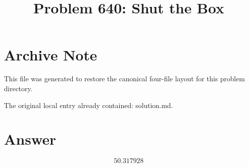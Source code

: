 \documentclass[11pt]{article}
\title{Problem 640: Shut the Box}
\author{}
\date{}
\begin{document}
\maketitle

\section{Archive Note}
This file was generated to restore the canonical four-file layout for this problem directory.

The original local entry already contained: solution.md.

\section{Answer}

\[
\boxed{50.317928}
\]
\end{document}
